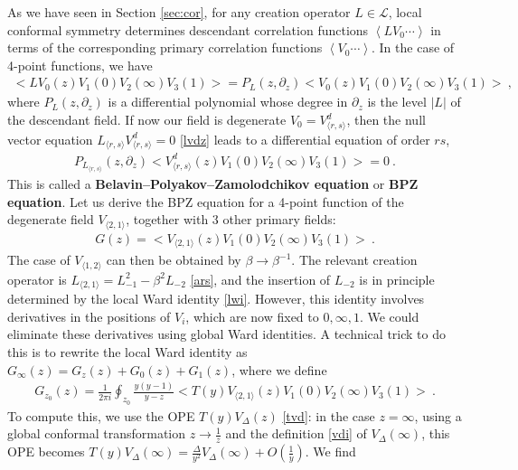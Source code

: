 \documentclass[12pt, a4paper]{article}
\theoremstyle{break}
\begin{document}
As we have seen in Section \ref{sec:cor}, for any creation operator $L\in\mathcal{L}$, local conformal symmetry determines descendant correlation functions $\left<LV_0\cdots \right>$ in terms of the corresponding primary correlation functions $\left<V_0\cdots \right>$.
In the case of 4-point functions, we have 
\begin{align}
 \Big<LV_0(z)V_1(0)V_2(\infty)V_3(1)\Big> = P_L(z,\partial_z) \Big<V_0(z)V_1(0)V_2(\infty)V_3(1)\Big>\ ,
\end{align}
where $P_L(z,\partial_z)$ is a differential polynomial whose degree in $\partial_z$ is the level $|L|$ of the descendant field. If now our field is degenerate $V_0= V^d_{\langle r,s\rangle}$, then the null vector equation $L_{\langle r,s\rangle}V^d_{\langle r,s\rangle}=0$ \eqref{lvdz} leads to a differential equation of order $rs$,
\begin{align}
 P_{L_{\langle r,s\rangle}}(z,\partial_z) \Big<V^d_{\langle r,s\rangle}(z)V_1(0)V_2(\infty)V_3(1)\Big> = 0\ .
\end{align}
This is called a \textbf{Belavin--Polyakov--Zamolodchikov equation} or \textbf{BPZ equation}.  
Let us derive the BPZ equation for a 4-point function  of the degenerate field $V_{\langle 2,1\rangle}$, together with 3 other primary fields:
\begin{align}
 G(z)=\Big<V_{\langle 2,1\rangle}(z)V_{1}(0)V_{2}(\infty)V_{3}(1)\Big>\ .
 \label{goz}
\end{align}
The case of $V_{\langle 1,2\rangle}$ can then be obtained by $\beta\to \beta^{-1}$. The relevant creation operator is $L_{\langle 2,1\rangle} = L_{-1}^2 -\beta^2L_{-2}$ \eqref{ars}, and the insertion of $L_{-2}$ is in principle determined by the local Ward identity \eqref{lwi}. However, this identity involves derivatives in the positions of $V_{i}$, which are now fixed to $0,\infty,1$. We could eliminate these derivatives using global Ward identities. A technical trick to do this is to rewrite the local Ward identity as $G_\infty(z) = G_{z}(z) + G_0(z) + G_1(z)$, where we define
\begin{align}
 G_{z_0}(z) = \frac{1}{2\pi i} \oint_{z_0} \frac{y(y-1)}{y-z} \Big< T(y)V_{\langle 2,1\rangle}(z)V_{1}(0)V_{2}(\infty)V_{3}(1)\Big> \ .
\end{align}
To compute this, we use the OPE $T(y)V_\Delta(z)$ \eqref{tvd}: in the case $z=\infty$, using a global conformal transformation $z\to \frac{1}{z}$ and the definition \eqref{vdi} of $V_\Delta(\infty)$, this OPE becomes $T(y)V_\Delta(\infty) = \frac{\Delta}{y^2} V_\Delta(\infty) + O(\frac{1}{y})$. We find 
\end{document}
